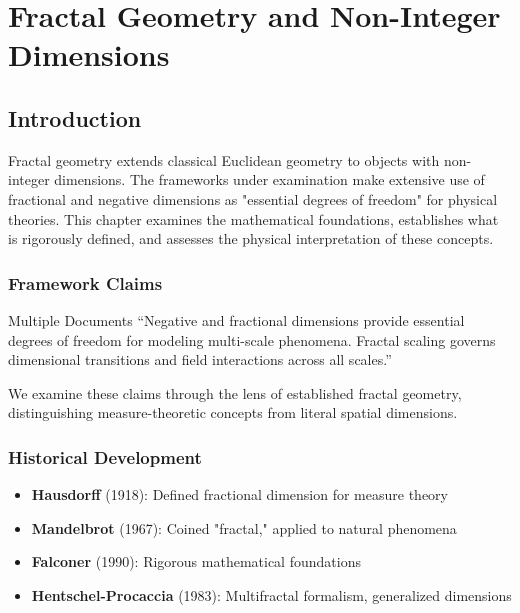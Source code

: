 
\chapter{Fractal Geometry and Non-Integer Dimensions}
\label{ch:fractal_geometry}

\section{Introduction}

Fractal geometry extends classical Euclidean geometry to objects with non-integer dimensions. The frameworks under examination make extensive use of fractional and negative dimensions as "essential degrees of freedom" for physical theories. This chapter examines the mathematical foundations, establishes what is rigorously defined, and assesses the physical interpretation of these concepts.

\subsection{Framework Claims}

\begin{frameworkclaim}{Multiple Documents}
``Negative and fractional dimensions provide essential degrees of freedom for modeling multi-scale phenomena. Fractal scaling governs dimensional transitions and field interactions across all scales.''
\end{frameworkclaim}

We examine these claims through the lens of established fractal geometry, distinguishing measure-theoretic concepts from literal spatial dimensions.

\subsection{Historical Development}

\begin{itemize}
    \item \textbf{Hausdorff} (1918): Defined fractional dimension for measure theory
    \item \textbf{Mandelbrot} (1967): Coined "fractal," applied to natural phenomena
    \item \textbf{Falconer} (1990): Rigorous mathematical foundations
    \item \textbf{Hentschel-Procaccia} (1983): Multifractal formalism, generalized dimensions
\end{itemize}

